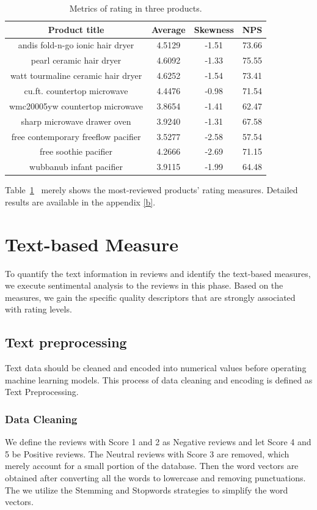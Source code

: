\documentclass[12pt]{article}%
\begin{document}
\begin{table}[H]
	\centering
	\caption{Metrics of rating in three products.}	
	\begin{tabular}{cccc}
		\toprule[1.5pt]
		\multicolumn{1}{m{7cm}}{\centering Product title} & \multicolumn{1}{m{2cm}}{\centering Average}&
		\multicolumn{1}{m{2cm}}{\centering Skewness} &
		\multicolumn{1}{m{2cm}}{\centering NPS} \\
		\midrule[1pt]
		andis fold-n-go ionic hair dryer &4.5129&-1.51&73.66\\
		pearl ceramic hair dryer     & 4.6092&-1.33&75.55\\
		watt tourmaline ceramic hair dryer          &4.6252&-1.54&73.41\\
		\midrule[1pt]
		cu.ft. countertop microwave          &4.4476&-0.98&71.54\\
		wmc20005yw  countertop microwave          &3.8654&-1.41&62.47\\
		sharp microwave drawer oven        &3.9240&-1.31&67.58\\
		\midrule[1pt]
		free contemporary freeflow pacifier        &3.5277&-2.58&57.54\\
		free soothie pacifier       &4.2666&-2.69&71.15\\
		wubbanub infant pacifier&3.9115&-1.99&64.48\\
		\bottomrule[1.6pt]
	\end{tabular}\label{bbbbso}
\end{table}
Table~\ref{bbbbso}~ merely shows the most-reviewed products' rating measures. Detailed results are available in the appendix \ref{b}.

\section{Text-based Measure }
To quantify the text information in reviews and identify the text-based measures, we execute sentimental analysis to the reviews in this phase. Based on the measures, we gain the specific quality descriptors that are strongly associated with rating levels.
\subsection{Text preprocessing}
Text data should be cleaned and encoded into numerical values before operating machine learning models. This process of data cleaning and encoding is defined as Text Preprocessing.


\subsubsection{Data Cleaning}
We define the reviews with Score 1 and 2 as Negative reviews and let Score 4 and 5 be Positive reviews. The Neutral reviews with Score 3 are removed, which merely account for a small portion of the database. Then the word vectors\cite{BOW} are obtained after converting all the words to lowercase and removing punctuations. The we utilize the Stemming and Stopwords strategies to simplify the word vectors.
\end{document}
